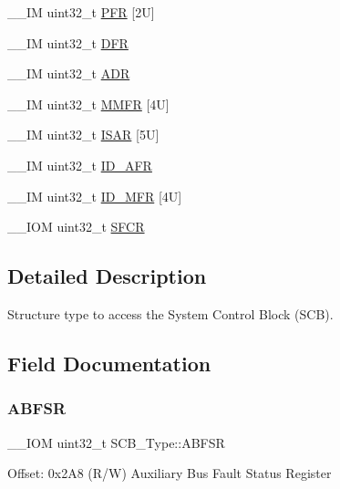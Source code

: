 \begin{DoxyCompactItemize}
\+\_\+\+\_\+\+IM uint32\+\_\+t \hyperlink{struct_s_c_b___type_a40745bb0af880c45827a653222d54117}{P\+FR} \mbox{[}2\+U\mbox{]}
\item 
\+\_\+\+\_\+\+IM uint32\+\_\+t \hyperlink{struct_s_c_b___type_a85dd6fe77aab17e7ea89a52c59da6004}{D\+FR}
\item 
\+\_\+\+\_\+\+IM uint32\+\_\+t \hyperlink{struct_s_c_b___type_af084e1b2dad004a88668efea1dfe7fa1}{A\+DR}
\item 
\+\_\+\+\_\+\+IM uint32\+\_\+t \hyperlink{struct_s_c_b___type_a4f353f207bb27a1cea7861aa9eb00dbb}{M\+M\+FR} \mbox{[}4\+U\mbox{]}
\item 
\+\_\+\+\_\+\+IM uint32\+\_\+t \hyperlink{struct_s_c_b___type_a00e93446b3433a807f1574fa2f1fce54}{I\+S\+AR} \mbox{[}5\+U\mbox{]}
\item 
\+\_\+\+\_\+\+IM uint32\+\_\+t \hyperlink{struct_s_c_b___type_a9c9a1d805f8e99b9fd3ab4f455b6333a}{I\+D\+\_\+\+A\+FR}
\item 
\+\_\+\+\_\+\+IM uint32\+\_\+t \hyperlink{struct_s_c_b___type_a781ef24d88610a432e7d5b179d78de47}{I\+D\+\_\+\+M\+FR} \mbox{[}4\+U\mbox{]}
\item 
\+\_\+\+\_\+\+I\+OM uint32\+\_\+t \hyperlink{struct_s_c_b___type_a82273352d2e8c7a28a7b7cbdfc3d6a75}{S\+F\+CR}
\end{DoxyCompactItemize}


\subsection{Detailed Description}
Structure type to access the System Control Block (S\+CB). 

\subsection{Field Documentation}
\mbox{\label{struct_s_c_b___type_a35a95c9a21f43a569a7ac212acb4cee7}} 
\subsubsection{\texorpdfstring{A\+B\+F\+SR}{ABFSR}}
{\footnotesize\ttfamily \+\_\+\+\_\+\+I\+OM uint32\+\_\+t S\+C\+B\+\_\+\+Type\+::\+A\+B\+F\+SR}

Offset\+: 0x2\+A8 (R/W) Auxiliary Bus Fault Status Register \mbox{\label{struct_s_c_b___type_af084e1b2dad004a88668efea1dfe7fa1}} 
